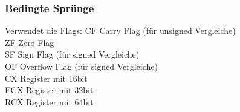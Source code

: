 \documentclass[a4paper,12pt,twoside]{article}
\begin{document}
\subsubsection{Bedingte Sprünge}
Verwendet die Flags:
\hspace{2mm} CF \hspace{50mm} Carry Flag (für unsigned Vergleiche) \\ 
\hspace{2mm} ZF \hspace{50mm} Zero Flag \\ 
\hspace{2mm} SF \hspace{50mm} Sign Flag (für signed Vergleiche) \\ 
\hspace{2mm} OF \hspace{50mm} Overflow Flag (für signed Vergleiche) \\
\hspace{2mm} CX \hspace{50mm} Register mit 16bit \\ 
\hspace{2mm} ECX \hspace{50mm} Register mit 32bit \\ 
\hspace{2mm} RCX \hspace{50mm} Register mit 64bit \\
\end{document}
